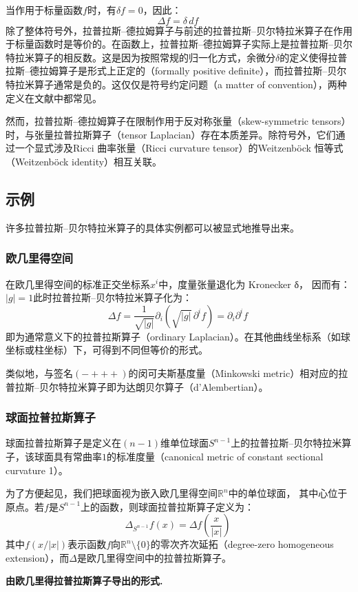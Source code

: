 当作用于标量函数$f$时，有$\delta f = 0$，因此：
\[
\Delta f = \delta\, df~
\]
除了整体符号外，拉普拉斯–德拉姆算子与前述的拉普拉斯–贝尔特拉米算子在作用于标量函数时是等价的。在函数上，拉普拉斯–德拉姆算子实际上是拉普拉斯–贝尔特拉米算子的相反数。这是因为按照常规的归一化方式，余微分$\delta$的定义使得拉普拉斯–德拉姆算子是形式上正定的（formally positive definite），而拉普拉斯–贝尔特拉米算子通常是负的。这仅仅是符号约定问题（a matter of convention），两种定义在文献中都常见。

然而，拉普拉斯–德拉姆算子在限制作用于反对称张量（skew-symmetric tensors）时，与张量拉普拉斯算子（tensor Laplacian）存在本质差异。除符号外，它们通过一个显式涉及Ricci 曲率张量（Ricci curvature tensor）的Weitzenböck 恒等式（Weitzenböck identity）相互关联。
\subsection{示例}
许多拉普拉斯–贝尔特拉米算子的具体实例都可以被显式地推导出来。
\subsubsection{欧几里得空间}
在欧几里得空间的标准正交坐标系$x^{i}$中，度量张量退化为 Kronecker δ，
因而有：$|g| = 1$此时拉普拉斯–贝尔特拉米算子化为：
\[
\Delta f
= \frac{1}{\sqrt{|g|}} \partial_{i} \left( \sqrt{|g|}\, \partial^{i} f \right)
= \partial_{i} \partial^{i} f~
\]
即为通常意义下的拉普拉斯算子（ordinary Laplacian）。在其他曲线坐标系（如球坐标或柱坐标）下，可得到不同但等价的形式。

类似地，与签名$(- + + +)$的闵可夫斯基度量（Minkowski metric）相对应的拉普拉斯–贝尔特拉米算子即为达朗贝尔算子（d’Alembertian）。
\subsubsection{球面拉普拉斯算子}
球面拉普拉斯算子是定义在$(n-1)$维单位球面$S^{n-1}$上的拉普拉斯–贝尔特拉米算子，该球面具有常曲率$1$的标准度量（canonical metric of constant sectional curvature 1）。

为了方便起见，我们把球面视为嵌入欧几里得空间$\mathbb{R}^{n}$中的单位球面，
其中心位于原点。若$f$是$S^{n-1}$上的函数，则球面拉普拉斯算子定义为：
\[
\Delta_{S^{n-1}} f(x)
= \Delta f\!\left( \frac{x}{|x|} \right)~
\]
其中$f(x/|x|)$表示函数$f$向$\mathbb{R}^{n} \setminus \{0\}$的零次齐次延拓（degree-zero homogeneous extension），而$\Delta$是欧几里得空间中的拉普拉斯算子。

\textbf{由欧几里得拉普拉斯算子导出的形式.}

